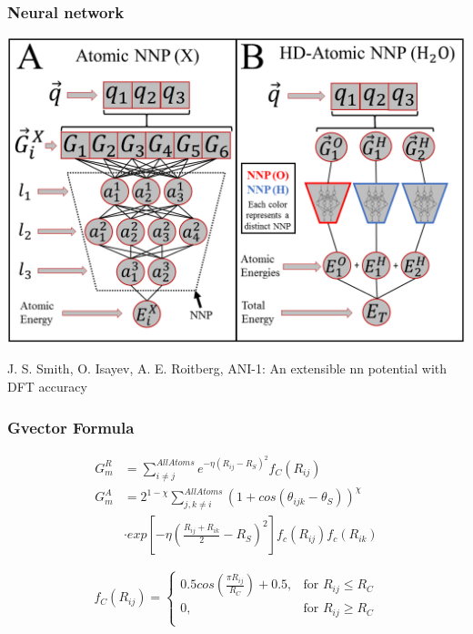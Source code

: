 \documentclass[12pt,notes=off,unicode]{beamer}
\begin{document}
    \begin{frame}[c]\frametitle{Neural network}
        
      \includegraphics[width=\textwidth]{nn_ani}
      \par\hfill \tiny J. S. Smith, O. Isayev, A. E. Roitberg, ANI-1: An extensible nn potential with DFT accuracy
    \end{frame}

    \begin{frame}[c]\frametitle{Gvector Formula}
        
      \begin{align*}
        G^R_m &=\sum_{i\ne j}^{All Atoms} e^{-\eta (R_{ij}-R_S)^2} f_C(R_{ij})\\
        G^A_m &= 2^{1-\chi} \sum_{j,k \ne i}^{All Atoms} (1 + cos(\theta_{ijk} - \theta_S))^\chi  \\
        ~& \cdot exp\left[-\eta\left( \frac{R_{ij}+R_{ik}}{2}-R_S\right)^2\right] f_c(R_{ij})f_c(R_{ik})
      \end{align*}

      \begin{equation*}
        f_C(R_{ij})=
        \begin{cases}
           0.5 cos\left(\frac{\pi R_{ij}}{R_C}\right) + 0.5, & \mbox{for } R_{ij}\le R_C \\  
           0, & \mbox{for } R_{ij}\ge R_C \\  
        \end{cases}
      \end{equation*}
    
    \end{frame}
\end{document}
